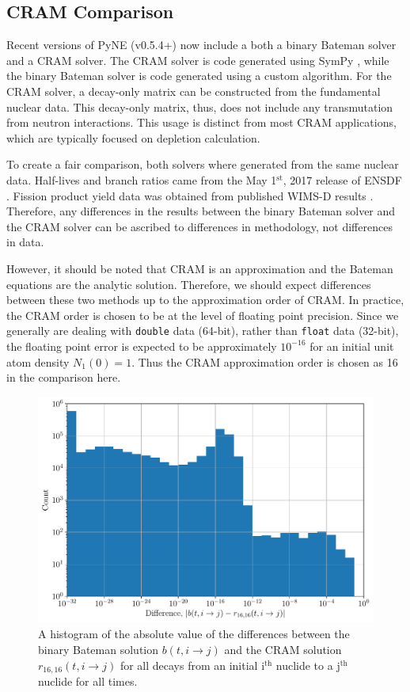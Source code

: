 \documentclass[letterpaper]{physor2018}
\newcommand{\ith}{i$^{\mathrm{th}}$\xspace}
\newcommand{\jth}{j$^{\mathrm{th}}$\xspace}
\begin{document}
\subsection{CRAM Comparison}
\label{subsec-cram}
Recent versions of PyNE (v0.5.4+)
now include a both a binary Bateman solver and a CRAM solver.
The CRAM solver is code generated using SymPy \cite{10.7717/peerj-cs.103},
while the binary Bateman solver is code generated using a custom algorithm.
For the CRAM solver, a decay-only matrix can be constructed from the
fundamental nuclear data. This decay-only matrix, thus, does not include
any transmutation from neutron interactions. This usage is distinct from
most CRAM applications, which are typically focused on depletion calculation.

To create a fair comparison, both solvers where generated from the same
nuclear data. Half-lives and branch
ratios came from the May 1$^{\mathrm{st}}$, 2017 release of ENSDF
\cite{Bhat1992,ensdfmaintained}. Fission product yield data was obtained
from published WIMS-D results \cite{aldama2003wims}. Therefore, any differences
in the results between the binary Bateman solver and the CRAM
solver can be ascribed to differences in methodology, not differences in data.

However, it should be noted that CRAM is an approximation and the Bateman
equations are the analytic solution. Therefore, we should expect differences
between these two methods up to the approximation order of CRAM. In practice,
the CRAM order is chosen to be at the level of floating point precision.
Since we generally are dealing with \texttt{double} data (64-bit), rather than
\texttt{float} data (32-bit), the floating point error is expected to be
approximately $10^{-16}$ for an initial unit atom density $N_1(0) = 1$.
Thus the CRAM approximation order is chosen as 16 in the comparison here.

\begin{figure}[!htb]
  \centering
  \includegraphics[scale=0.80]{./diff-hist.pdf}
  \caption{A histogram of the absolute value of the differences between the
           binary Bateman solution $b(t, i\to j)$
           and the CRAM solution  $r_{16,16}(t, i\to j)$ for all decays
           from an initial \ith nuclide to a \jth nuclide for all times.}
  \label{fig-diff-hist}
\end{figure}
\end{document}
